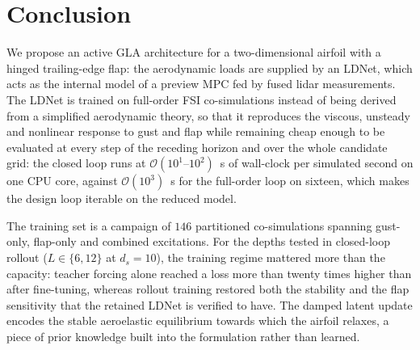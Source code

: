 \section{Conclusion}
\label{sec:conclusion}

We propose an active GLA architecture for a two-dimensional airfoil with a hinged
trailing-edge flap: the aerodynamic loads are supplied by an LDNet, which acts as the internal
model of a preview MPC fed by fused lidar measurements. The LDNet is trained on full-order FSI
co-simulations instead of being derived from a simplified aerodynamic theory, so that it
reproduces the viscous, unsteady and nonlinear response to gust and flap while remaining cheap
enough to be evaluated at every step of the receding horizon and over the whole candidate
grid: the closed loop runs at $\mathcal{O}(10^{1}\text{--}10^{2})$~s of wall-clock per
simulated second on one CPU core, against $\mathcal{O}(10^{3})$~s for the full-order loop on
sixteen, which makes the design loop iterable on the reduced model.

The training set is a campaign of $146$ partitioned co-simulations spanning gust-only,
flap-only and combined excitations. For the depths tested in closed-loop rollout ($L\in\{6,12\}$
at $d_s=10$), the training regime mattered
more than the capacity: teacher forcing alone reached a loss more than twenty times
higher than after fine-tuning, whereas rollout training restored both the stability and the flap
sensitivity that the retained LDNet is verified to have. The damped latent update encodes the
stable aeroelastic equilibrium towards which the airfoil relaxes, a piece of prior knowledge
built into the formulation rather than learned.

